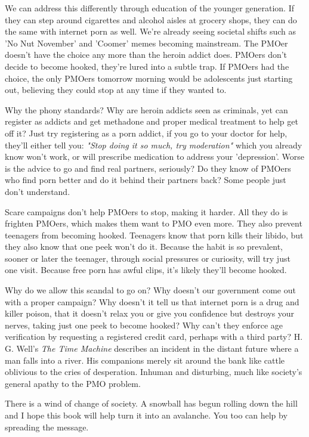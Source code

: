 \documentclass[easypeasy.tex]{subfiles}
\begin{document}
We can address this differently through education of the younger generation. If they can step around cigarettes and alcohol aisles at grocery shops, they can do the same with internet porn as well. We're already seeing societal shifts such as 'No Nut November' and 'Coomer' memes becoming mainstream. The PMOer doesn't have the choice any more than the heroin addict does. PMOers don't decide to become hooked, they're lured into a subtle trap. If PMOers had the choice, the only PMOers tomorrow morning would be adolescents just starting out, believing they could stop at any time if they wanted to.

Why the phony standards? Why are heroin addicts seen as criminals, yet can register as addicts and get methadone and proper medical treatment to help get off it? Just try registering as a porn addict, if you go to your doctor for help, they'll either tell you: \textit{"Stop doing it so much, try moderation"} which you already know won't work, or will prescribe medication to address your 'depression'. Worse is the advice to go and find real partners, seriously? Do they know of PMOers who find porn better and do it behind their partners back? Some people just don't understand.

Scare campaigns don't help PMOers to stop, making it harder. All they do is frighten PMOers, which makes them want to PMO even more. They also prevent teenagers from becoming hooked. Teenagers know that porn kills their libido, but they also know that one peek won't do it. Because the habit is so prevalent, sooner or later the teenager, through social pressures or curiosity, will try just one visit. Because free porn has awful clips, it's likely they'll become hooked.

Why do we allow this scandal to go on? Why doesn't our government come out with a proper campaign? Why doesn't it tell us that internet porn is a drug and killer poison, that it doesn't relax you or give you confidence but destroys your nerves, taking just one peek to become hooked? Why can't they enforce age verification by requesting a registered credit card, perhaps with a third party? H. G. Well's \textit{The Time Machine} describes an incident in the distant future where a man falls into a river. His companions merely sit around the bank like cattle oblivious to the cries of desperation. Inhuman and disturbing, much like society's general apathy to the PMO problem.

There is a wind of change of society. A snowball has begun rolling down the hill and I hope this book will help turn it into an avalanche. You too can help by spreading the message.
\end{document}
